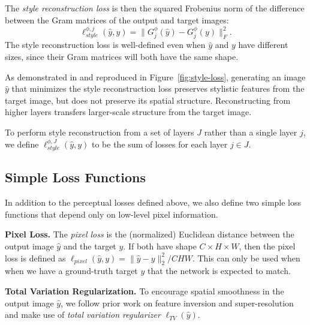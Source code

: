\documentclass[runningheads]{llncs}
\begin{document}
The \emph{style reconstruction loss} is then the squared Frobenius norm of the difference between
the Gram matrices of the output and target images:
\begin{equation}
  \ell_{style}^{\phi, j}(\hat y, y) = \|G^\phi_j(\hat y) - G^\phi_j(y)\|_F^2.
\end{equation}
The style reconstruction loss is well-defined even when $\hat y$ and $y$ have different
sizes, since their Gram matrices will both have the same shape.

As demonstrated in \cite{gatys2015neural} and reproduced in Figure~\ref{fig:style-loss},
generating an image $\hat y$ that minimizes the style reconstruction loss preserves stylistic
features from the target image, but does not preserve its spatial structure. Reconstructing
from higher layers transfers larger-scale structure from the target image.

To perform style reconstruction from a set of layers $J$ rather than a single layer $j$,
we define $\ell_{style}^{\phi, J}(\hat y, y)$ to be the sum of losses for each layer $j\in J$.


\subsection{Simple Loss Functions}
In addition to the perceptual losses defined above, we also define two simple loss functions
that depend only on low-level pixel information.

\vspace{1mm}
\noindent \textbf{Pixel Loss.}
The \emph{pixel loss} is the (normalized) Euclidean distance between the output image
$\hat y$ and the target $y$. If both have shape $C\times H\times W$, then the pixel loss is
defined as $\ell_{pixel}(\hat y, y) = \|\hat y - y\|^2_2 / CHW$. This can only be used
when when we have a ground-truth target $y$ that the network is expected to match.

\vspace{1mm}
\noindent\textbf{Total Variation Regularization.}
To encourage spatial smoothness in the output image $\hat y$, we
follow prior work on feature inversion \cite{mahendran15understanding,d2012beyond}
and super-resolution~\cite{aly2005image,zhang2010non} and make use of
\emph{total variation regularizer} $\ell_{TV}(\hat y)$.
\end{document}

